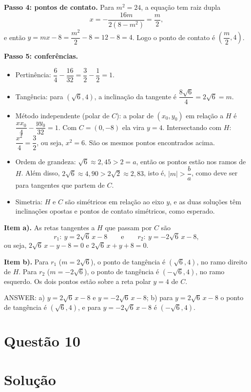 \documentclass{article}%
\begin{document}
\textbf{Passo 4: pontos de contato.} Para $m^2=24$, a equação tem raiz dupla
\[
x=-\frac{16m}{2(8-m^2)}=\frac{m}{2},
\]
e então $y=mx-8=\dfrac{m^2}{2}-8=12-8=4$. Logo o ponto de contato é $\left(\dfrac{m}{2},4\right)$.

\textbf{Passo 5: conferências.}
\begin{itemize}
\item Pertinência: $\dfrac{6}{4}-\dfrac{16}{32}=\dfrac{3}{2}-\dfrac{1}{2}=1$.
\item Tangência: para $(\sqrt{6},4)$, a inclinação da tangente é $\dfrac{8\sqrt{6}}{4}=2\sqrt{6}=m$.
\item Método independente (polar de $C$): a polar de $(x_0,y_0)$ em relação a $H$ é $\dfrac{x x_0}{4}-\dfrac{y y_0}{32}=1$. Com $C=(0,-8)$ ela vira $y=4$. Intersectando com $H$: $\dfrac{x^2}{4}=\dfrac{3}{2}$, ou seja, $x^2=6$. São os mesmos pontos encontrados acima.
\item Ordem de grandeza: $\sqrt{6}\approx 2{,}45>2=a$, então os pontos estão nos ramos de $H$. Além disso, $2\sqrt{6}\approx 4{,}90>2\sqrt{2}\approx 2{,}83$, isto é, $|m|>\dfrac{b}{a}$, como deve ser para tangentes que partem de $C$.
\item Simetria: $H$ e $C$ são simétricos em relação ao eixo $y$, e as duas soluções têm inclinações opostas e pontos de contato simétricos, como esperado.
\end{itemize}

\textbf{Item a).} As retas tangentes a $H$ que passam por $C$ são
\[
r_1:\ y=2\sqrt{6}\,x-8 \qquad \text{e} \qquad r_2:\ y=-2\sqrt{6}\,x-8,
\]
ou seja, $2\sqrt{6}\,x-y-8=0$ e $2\sqrt{6}\,x+y+8=0$.

\textbf{Item b).} Para $r_1$ ($m=2\sqrt{6}$), o ponto de tangência é $(\sqrt{6},4)$, no ramo direito de $H$. Para $r_2$ ($m=-2\sqrt{6}$), o ponto de tangência é $(-\sqrt{6},4)$, no ramo esquerdo. Os dois pontos estão sobre a reta polar $y=4$ de $C$.

ANSWER: a) $y=2\sqrt{6}\,x-8$ e $y=-2\sqrt{6}\,x-8$; b) para $y=2\sqrt{6}\,x-8$ o ponto de tangência é $(\sqrt{6},4)$, e para $y=-2\sqrt{6}\,x-8$ é $(-\sqrt{6},4)$.%
\newpage%
\section*{Questão 10}

\section*{Solução}
\end{document}
